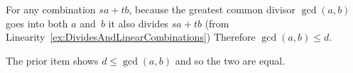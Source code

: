 \documentclass{ibl}
\begin{document}
\begin{bezoutproof}
\begin{ex}
\begin{ans}
\begin{exes}
  For any combination $sa+tb$, because the greatest common divisor
  $\gcd(a,b)$ goes into both $a$ and~$b$ it also divides $sa+tb$  
  (from Linearity~\ref{ex:DividesAndLinearCombinations})
  Therefore $\gcd(a,b)\leq d$.

  The prior item shows $d\leq\gcd(a,b)$ and so the two are equal. 





\end{exes}
\end{ans}
\end{ex}


\end{bezoutproof}
\end{document}
